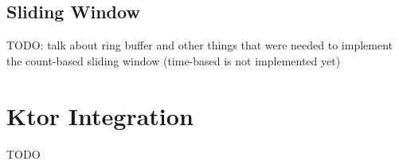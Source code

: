 \subsection{Sliding Window}\label{subsec:cbreaker-sliding-window}

TODO: talk about ring buffer and other things that were needed to implement the count-based sliding window (time-based is not implemented yet)


\section{Ktor Integration}\label{sec:cbreaker-ktor-integration}

TODO
